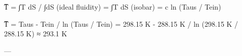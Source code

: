 T̅ = ∫T dS / ∫dS (ideal fluidity) = ∫T dS (isobar) = c ln (Taus / Tein)  

T̅ = Taus - Tein / ln (Taus / Tein)  
= 298.15 K - 288.15 K / ln (298.15 K / 288.15 K)  
≈ 293.1 K  

---